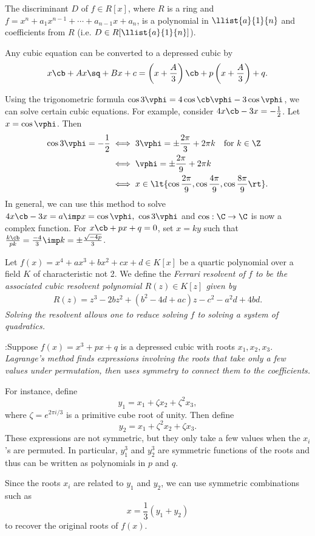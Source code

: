 \documentclass[a4paper]{article}
\begin{document}
\begin{tcorollary}
  The discriminant \( D \) of \( f\in R[x] \), where \( R \) is a ring and \( f= x^n+a_1x^{n-1}+\cdots + a_{n-1}x+a_n\), is a polynomial in \( \llist{a}{1}{n} \) and coefficients from \( R \) (i.e. \( D \in R[\llist{a}{1}{n}] \)).
\end{tcorollary}

 \quad
Any cubic equation can be converted to a depressed cubic by \begin{align*}
  x\cb+Ax\sq+Bx+c = \left(x+\frac{A}{3}\right)\cb + p\left(x+\frac{A}{3}\right) + q.
\end{align*}

\quad
Using the trigonometric formula \( \cos 3\vphi = 4\cos\cb \vphi-3\cos\vphi \), we can solve certain cubic equations.
For example, consider \( 4x\cb-3x=-\frac{1}{2} \).
Let \( x=\cos \vphi \).
Then \begin{align*}
  \cos 3\vphi = -\frac{1}{2} &\iff 3\vphi = \pm \frac{2\pi}{3}+2\pi k \quad \text{for } k\in \Z \\
  &\iff \vphi = \pm\frac{2\pi}{9}+2\pi k \\
  &\iff x \in \lt\{ \cos\frac{2\pi}{9},\cos\frac{4\pi}{9},\cos\frac{8\pi}{9} \rt\}.
\end{align*}
In general, we can use this method to solve \( 4x\cb-3x=a \imp x=\cos\vphi,\ \cos 3\vphi \) and \( \cos:\C\to\C \) is now a complex function.
For \( x\cb+px+q = 0 \), set \( x=ky \) such that \( \frac{k\cb}{pk} = \frac{-4}{3} \imp k = \pm\frac{\sqrt{-4p}}{3} \).

\begin{tdefinition}
  Let \( f(x) = x^4 + a x^3 + b x^2 + c x + d \in K[x] \) be a quartic polynomial over a field \( K \) of characteristic not 2.
  We define the \it{Ferrari resolvent} of \( f \) to be the associated cubic resolvent polynomial \( R(z) \in K[z] \) given by
  \begin{align*}
    R(z) = z^3 - 2b z^2 + (b^2 - 4d + a c) z - c^2 - a^2 d + 4b d.
  \end{align*}
  Solving the resolvent allows one to reduce solving \( f \) to solving a system of quadratics.
\end{tdefinition}

:\quad Suppose \( f(x) = x^3 + px + q \) is a depressed cubic with roots \( x_1, x_2, x_3 \).
    \it{Lagrange's method} finds expressions involving the roots that take only a few values under permutation, then uses symmetry to connect them to the coefficients.

    For instance, define
    \[
      y_1 = x_1 + \zeta x_2 + \zeta^2 x_3,
    \]
    where \( \zeta = e^{2\pi i/3} \) is a primitive cube root of unity. Then define
    \[
      y_2 = x_1 + \zeta^2 x_2 + \zeta x_3.
    \]
    These expressions are not symmetric, but they only take a few values when the \( x_i \)'s are permuted. In particular, \( y_1^3 \) and \( y_2^3 \) are symmetric functions of the roots and thus can be written as polynomials in \( p \) and \( q \).

    Since the roots \( x_i \) are related to \( y_1 \) and \( y_2 \), we can use symmetric combinations such as
    \[
      x = \frac{1}{3}(y_1 + y_2)
    \]
    to recover the original roots of \( f(x) \).
\end{document}
